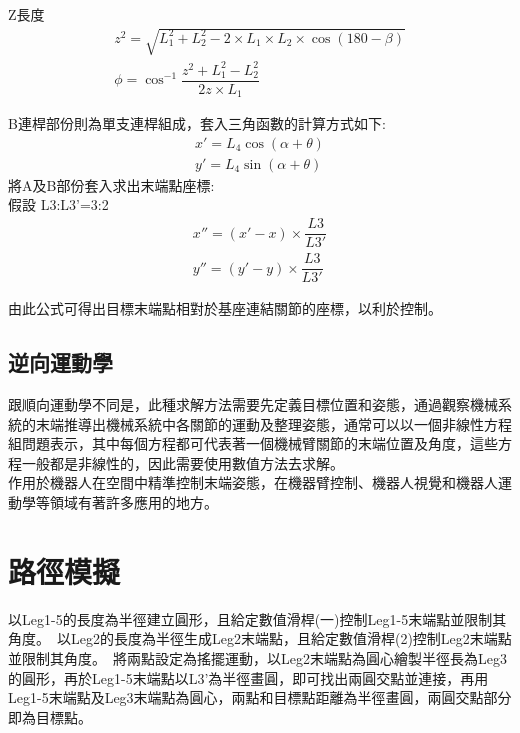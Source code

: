Z長度
\[
\begin{aligned}
z^{2}=\sqrt{L_{1}^{2}+L_{2}^{2}-2\times L_{1}\times L_{2}\times \cos \left( 180-\beta \right) }\\
\phi =\cos ^{-1}\dfrac{z^{2}+L_{1}^{2}-L_{2}^{2}}{2z\times L_{1}}
\end{aligned}
\]

B連桿部份則為單支連桿組成，套入三角函數的計算方式如下:\\

\[
\begin{aligned}
x'=L_{4}\cos \left( \alpha +\theta \right)\\
y'=L_{4}\sin \left( \alpha +\theta \right)
\end{aligned}
\]
將A及B部份套入求出末端點座標:\\

假設
L3:L3'=3:2
\[
\begin{aligned}
x''=\left( x'-x\right) \times \dfrac{L3}{L3'}\\
y''=\left( y'-y\right) \times \dfrac{L3}{L3'}
\end{aligned}
\]

由此公式可得出目標末端點相對於基座連結關節的座標，以利於控制。\\

\subsection{逆向運動學}
跟順向運動學不同是，此種求解方法需要先定義目標位置和姿態，通過觀察機械系統的末端推導出機械系統中各關節的運動及整理姿態，通常可以以一個非線性方程組問題表示，其中每個方程都可代表著一個機械臂關節的末端位置及角度，這些方程一般都是非線性的，因此需要使用數值方法去求解。\\
作用於機器人在空間中精準控制末端姿態，在機器臂控制、機器人視覺和機器人運動學等領域有著許多應用的地方。\\

\section{路徑模擬}
以Leg1-5的長度為半徑建立圓形，且給定數值滑桿(一)控制Leg1-5末端點並限制其角度。\
以Leg2的長度為半徑生成Leg2末端點，且給定數值滑桿(2)控制Leg2末端點並限制其角度。\
將兩點設定為搖擺運動，以Leg2末端點為圓心繪製半徑長為Leg3的圓形，再於Leg1-5末端點以L3’為半徑畫圓，即可找出兩圓交點並連接，再用Leg1-5末端點及Leg3末端點為圓心，兩點和目標點距離為半徑畫圓，兩圓交點部分即為目標點。
\newpage
